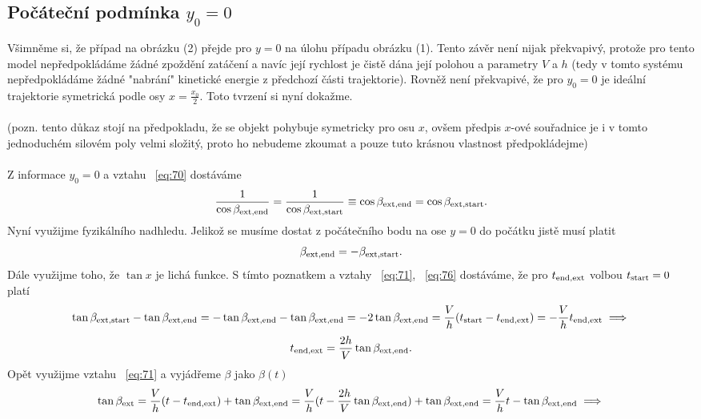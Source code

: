 \documentclass[reqno, a4paper]{amsart}
\begin{document}
\subsection*{Počáteční podmínka $y_0=0$}
Všimněme si, že případ na obrázku (2) přejde pro $y=0$ na úlohu případu obrázku (1). Tento závěr není nijak překvapivý, protože pro tento model nepředpokládáme žádné zpoždění zatáčení a navíc její rychlost je čistě dána její polohou a parametry $V$ a $h$ (tedy v tomto systému nepředpokládáme žádné "nabrání" kinetické energie z předchozí části trajektorie). Rovněž není překvapivé, že pro $y_0=0$ je ideální trajektorie symetrická podle osy $x=\frac{x_0}{2}$. Toto tvrzení si nyní dokažme.\\
\\
(pozn. tento důkaz stojí na předpokladu, že se objekt pohybuje symetricky pro osu $x$, ovšem předpis $x$-ové souřadnice je i v tomto jednoduchém silovém poly velmi složitý, proto ho nebudeme zkoumat a pouze tuto krásnou vlastnost předpokládejme)\\
\\
Z informace $y_0=0$ a vztahu ~\eqref{eq:70} dostáváme
\begin{equation}
	\label{eq:75}
	\frac{1}{\cos\beta_{\mathrm{ext}, \mathrm{end}}} = \frac{1}{\cos\beta_{\mathrm{ext}, \mathrm{start}}} \equiv  \cos\beta_{\mathrm{ext}, \mathrm{end}} = \cos\beta_{\mathrm{ext}, \mathrm{start}}.
\end{equation}
Nyní využijme fyzikálního nadhledu. Jelikož se musíme dostat z počátečního bodu na ose $y=0$ do počátku jistě musí platit
\begin{equation}
	\label{eq:76}
	\beta_{\mathrm{ext}, \mathrm{end}}=-\beta_{\mathrm{ext}, \mathrm{start}}.
\end{equation}
Dále využijme toho, že $\tan x$ je lichá funkce. S tímto poznatkem a vztahy ~\eqref{eq:71}, ~\eqref{eq:76} dostáváme, že pro $t_{\mathrm{end}, \mathrm{ext}}$ volbou $t_{\mathrm{start}}=0$ platí
\begin{equation*}
	\tan \beta_{\mathrm{ext}, \mathrm{start}} -  \tan \beta_{\mathrm{ext}, \mathrm{end}} = -\tan \beta_{\mathrm{ext}, \mathrm{end}} -  \tan \beta_{\mathrm{ext}, \mathrm{end}}=-2\tan \beta_{\mathrm{ext}, \mathrm{end}}
	=\frac{V}{h} (t_{\mathrm{start}} - t_{\mathrm{end}, \mathrm{ext}})=-\frac{V}{h} t_{\mathrm{end}, \mathrm{ext}} \implies
\end{equation*}
\begin{equation}
	\label{eq:77}
	t_{\mathrm{end}, \mathrm{ext}}=\frac{2h}{V}\tan \beta_{\mathrm{ext}, \mathrm{end}}.
\end{equation}
Opět využijme vztahu ~\eqref{eq:71} a vyjádřeme $\beta$ jako $\beta (t)$
\begin{equation*}
	\tan \beta_{\mathrm{ext}} = \frac{V}{h}(t-t_{\mathrm{end}, \mathrm{ext}})+\tan \beta_{\mathrm{ext}, \mathrm{end}}=\frac{V}{h}(t-\frac{2h}{V}\tan \beta_{\mathrm{ext}, \mathrm{end}})+\tan \beta_{\mathrm{ext}, \mathrm{end}}=\frac{V}{h}t - \tan \beta_{\mathrm{ext}, \mathrm{end}} \implies
\end{equation*}
\end{document}
